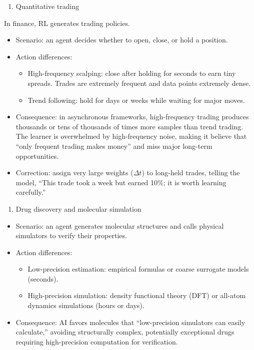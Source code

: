 \begin{enumerate}
\def\labelenumi{(\arabic{enumi})}
\tightlist
\item
  Quantitative trading
\end{enumerate}

In finance, RL generates trading policies.

\begin{itemize}
\tightlist
\item
  Scenario: an agent decides whether to open, close, or hold a position.
\item
{}
  Action differences:

  \begin{itemize}
  \tightlist
  \item
    High-frequency scalping: close after holding for seconds to earn tiny spreads. Trades are extremely frequent and data points extremely dense.
  \item
    Trend following: hold for days or weeks while waiting for major moves.
  \end{itemize}
\item
  Consequence: in asynchronous frameworks, high-frequency trading produces thousands or tens of thousands of times more samples than trend trading. The learner is overwhelmed by high-frequency noise, making it believe that ``only frequent trading makes money'' and miss major long-term opportunities.
\item
  Correction: assign very large weights (\(\Delta t\)) to long-held trades, telling the model, ``This trade took a week but earned 10\%; it is worth learning carefully.''
\end{itemize}

\begin{enumerate}
\def\labelenumi{(\arabic{enumi})}
\setcounter{enumi}{1}
\tightlist
\item
  Drug discovery and molecular simulation
\end{enumerate}

\begin{itemize}
\tightlist
\item
  Scenario: an agent generates molecular structures and calls physical simulators to verify their properties.
\item
{}
  Action differences:

  \begin{itemize}
  \tightlist
  \item
    Low-precision estimation: empirical formulas or coarse surrogate models (seconds).
  \item
    High-precision simulation: density functional theory (DFT) or all-atom dynamics simulations (hours or days).
  \end{itemize}
\item
  Consequence: AI favors molecules that ``low-precision simulators can easily calculate,'' avoiding structurally complex, potentially exceptional drugs requiring high-precision computation for verification.
\end{itemize}

